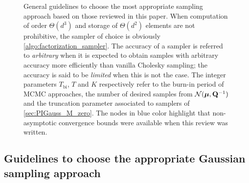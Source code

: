 \documentclass[nohypdvips,onefignum,onetabnum]{siamart171218}
\begin{document}
\begin{figure}
\caption{General guidelines to choose the most appropriate sampling approach based on those reviewed in this paper. 
When computation of order $\Theta(d^3)$ and storage of $\Theta(d^2)$ elements are not prohibitive, the sampler of choice is obviously \cref{algo:factorization_sampler}.
The accuracy of a sampler is referred to \emph{arbitrary} when it is expected to obtain samples with arbitrary accuracy more efficiently than vanilla Cholesky sampling; the accuracy is said to be \emph{limited} when this is not the case.
The integer parameters $T_{\mathrm{bi}}$, $T$ and $K$ respectively refer to the burn-in period of MCMC approaches, the number of desired samples from $\mathcal{N}(\boldsymbol{\mu},\mathbf{Q}^{-1})$ and the truncation parameter associated to samplers of \cref{sec:PIGauss_M_zero}.
The nodes in blue color highlight that non-asymptotic convergence bounds were available when this review was written.
}
\label{fig:guidelines}
\end{figure}


\subsection{Guidelines to choose the appropriate Gaussian sampling approach}
\label{subsec:discussion}
\end{document}
